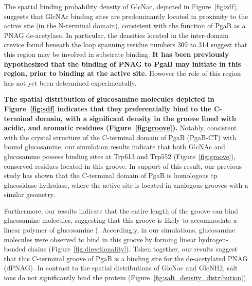 The spatial binding probability density of GlcNac, depicted in Figure~\ref{fig:sdf}, suggests that GlcNAc binding sites are predominantly located in proximity to the active site (in the N-terminal domain), consistent with the function of PgaB as a PNAG de-acetylase. In particular, the densities located in the inter-domain crevice found beneath the loop spanning residue numbers 309 to 314 suggest that this region may be involved in substrate binding. \textbf{It has been previously hypothesized that the binding of PNAG to PgaB may initiate in this region, prior to binding at the active site.}\cite{Little:2012dp} However the role of this region has not yet been determined experimentally.




\textbf{The spatial distribution of glucosamine molecules depicted in Figure~\ref{fig:sdf} indicates that they preferentially bind to the C-terminal domain, with a significant density in the groove lined with acidic, and aromatic residues (Figure~\ref{fig:groove}).}
Notably, consistent with the crystal structure of the C-terminal domain of PgaB (PgaB-CT) with bound glucosamine, our simulation results indicate that both GlcNAc and glucosamine possess binding sites at Trp613 and Trp552  (Figure~\ref{fig:groove}), conserved residues located in this groove.
In support of this result, our previous study has shown that the C-terminal domain of PgaB is homologous tp glucosidase hydrolase, where the active site is located in analogous grooves with a similar geometry.\cite{Little:2012dp} 

Furthermore, our results indicate that the entire length of the groove can bind glucosamine molecules, suggesting that this groove is likely to accommodate a linear polymer of glucosamine (. Accordingly, in our simulations, glucosamine molecules were observed to bind in this groove by forming linear hydrogen-bonded chains (Figure~\ref{fig:directionality}).  Taken together,  our results suggest that this C-terminal groove of PgaB is a binding site for the de-acetylated PNAG (dPNAG).   In contrast to the spatial distributions of GlcNac and GlcNH2, salt ions do not significantly bind the protein  (Figure~\ref{fig:salt_density_distribution}). 

